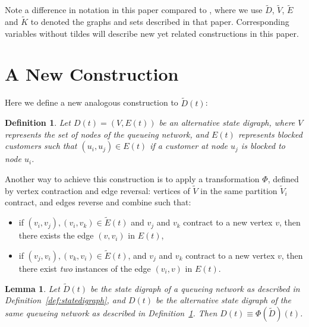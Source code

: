 \documentclass{article}
\newtheorem{definition}{Definition}
\newtheorem{lemma}{Lemma}
\begin{document}
Note a difference in notation in this paper compared to \cite{palmer2018}, where
we use $\tilde{D}$, $\tilde{V}$, $\tilde{E}$ and $\tilde{K}$ to denoted the
graphs and sets described in that paper.
Corresponding variables without tildes will describe new yet related
constructions in this paper.


\section{A New Construction}\label{sec:newconstruction}
Here we define a new analogous construction to $\tilde{D}(t)$:

\begin{definition}\label{def:altstatedigraph}
Let $D(t) = (V, E(t))$ be an alternative state digraph, where $V$ represents the
set of \textit{nodes} of the queueing network, and $E(t)$ represents blocked
customers such that $(u_i, u_j) \in E(t)$ if a customer at node $u_j$ is blocked
to node $u_i$.
\end{definition}

Another way to achieve this construction is to apply a transformation $\Phi$,
defined by vertex contraction and edge reversal: vertices of $\tilde{V}$ in the
same partition $\tilde{V}_i$ contract, and edges reverse and combine such that:

\begin{itemize}
  \item if $(v_i, v_j), (v_i, v_k) \in \tilde{E}(t)$ and $v_j$ and $v_k$
  contract to a new vertex $v$, then there exists the edge $(v, v_i)$ in $E(t)$,
  \item if $(v_j, v_i), (v_k, v_i) \in \tilde{E}(t)$, and $v_j$ and $v_k$
  contract to a new vertex $v$, then there exist \textit{two} instances of the
  edge $(v_i, v)$ in $E(t)$.
\end{itemize}

\begin{lemma}
Let $\tilde{D}(t)$ be the state digraph of a queueing network as described in
Definition~\ref{def:statedigraph}, and $D(t)$ be the alternative state digraph
of the same queueing network as described in
Definition~\ref{def:altstatedigraph}.
Then $D(t) \equiv \Phi(\tilde{D})(t)$.
\end{lemma}
\end{document}
